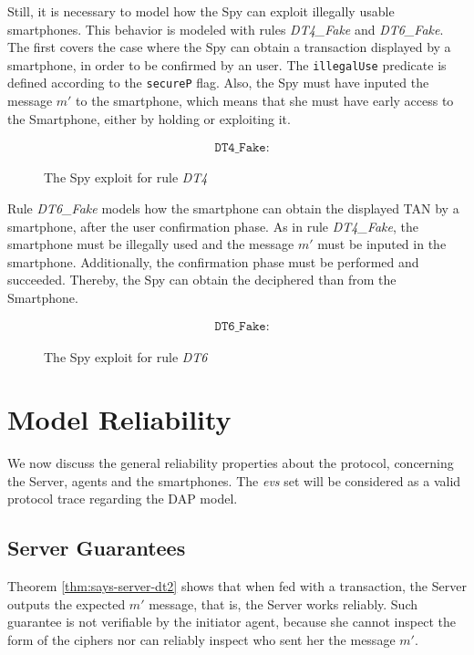 Still, it is necessary to model how the Spy can exploit illegally usable smartphones. This behavior is modeled with rules \textit{DT4\_Fake} and \textit{DT6\_Fake}. The first covers the case where the Spy can obtain a transaction displayed by a smartphone, in order to be confirmed by an user. The \texttt{illegalUse} predicate is defined according to the \texttt{secureP} flag. Also, the Spy must have inputed the message \(m'\) to the smartphone, which means that she must have early access to the Smartphone, either by holding or exploiting it.

\begin{figure}[!h]
  \begin{align*}
    & \texttt{DT4\_Fake}:
  \end{align*}
  \label{fig:dap-model-threat-dt4}
  \caption{The Spy exploit for rule \textit{DT4}}
\end{figure}

Rule \textit{DT6\_Fake} models how the smartphone can obtain the displayed TAN by a smartphone, after the user confirmation phase. As in rule \textit{DT4\_Fake}, the smartphone must be illegally used and the message $m'$ must be inputed in the smartphone. Additionally, the confirmation phase must be performed and succeeded. Thereby, the Spy can obtain the deciphered than from the Smartphone.

\begin{figure}[!h]
  \begin{align*}
    & \texttt{DT6\_Fake}:
  \end{align*}
  \label{fig:dap-model-threat-dt4}
  \caption{The Spy exploit for rule \textit{DT6}}
\end{figure}



\section{Model Reliability}
We now discuss the general reliability properties about the protocol, concerning the Server, agents and the smartphones. The \textit{evs} set will be considered as a valid protocol trace regarding the DAP model.


\subsection{Server Guarantees}
Theorem \ref{thm:says-server-dt2} shows that when fed with a transaction, the Server outputs the expected \(m'\) message, that is, the Server works reliably. Such guarantee is not verifiable by the initiator agent, because she cannot inspect the form of the ciphers nor can reliably inspect who sent her the message \(m'\).

